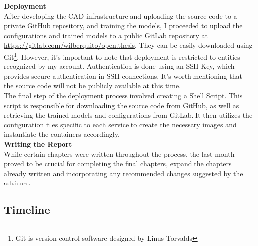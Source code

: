 \vspace{0.5cm}
\textbf{Deployment} \\

After developing the CAD infrastructure and uploading the source code to a private GitHub repository, and training the models, I proceeded to upload the configurations and trained models to a public GitLab repository at \url{https://gitlab.com/wilberquito/open.thesis}. They can be easily downloaded using Git\footnote{Git is version control software designed by Linus Torvalds}. However, it's important to note that deployment is restricted to entities recognized by my account. Authentication is done using an SSH Key, which provides secure authentication in SSH connections. It's worth mentioning that the source code will not be publicly available at this time. \\

The final step of the deployment process involved creating a Shell Script. This script is responsible for downloading the source code from GitHub, as well as retrieving the trained models and configurations from GitLab. It then utilizes the configuration files specific to each service to create the necessary images and instantiate the containers accordingly. \\

\vspace{0.5cm}
\textbf{Writing the Report} \\

While certain chapters were written throughout the process, the last month proved to be crucial for completing the final chapters, expand the chapters already written and incorporating any recommended changes suggested by the advisors.


\subsection{Timeline}

